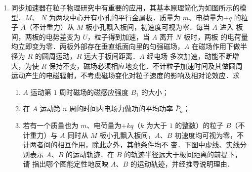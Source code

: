 \begin{enumerate}
\item 
{}
同步加速器在粒子物理研究中有重要的应用，其基本原理简化为如图所示的模型．$ M $、
$ N $ 为两块中心开有小孔的平行金属板．质量为 $ m $、电荷量为$ +q $ 的粒子
$ A $（不计重力）从 $ M $ 板小孔飘入板间，初速度可视为零．每当 $ A $ 进入
板间，两板的电势差变为 $ U $，粒子得到加速，当 $ A $ 离开 $ N $ 板时，两板
的电荷量均立即变为零．两板外部存在垂直纸面向里的匀强磁场，$ A $
在磁场作用下做半径为 $ R $ 的圆周运动，$ R $ 远大于板间距离．$ A $ 经电场
多次加速，动能不断增大，为使 $ R $ 保持不变，磁场必须相应地变化．不计粒子加速时间及其做圆周
运动产生的电磁辐射，不考虑磁场变化对粒子速度的影响及相对论效应．求
\begin{enumerate}
	\item
$ A $ 运动第 $ 1 $ 周时磁场的磁感应强度 $ B_{1} $ 的大小；

\item 
在 $ A $ 运动第 $ n $ 周的时间内电场力做功的平均功率 $ \bar{P}_{n} $；

\item 
若有一个质量也为 $ m $、电荷量为$ +kq $（$ k $ 为大于 $ 1 $ 的整数）的粒子 $ B $（不计重力）与 $ A $ 同时从
$ M $ 板小孔飘入板间，$ A $、$ B $ 初速度均可视为零，不计两者间的相互作用，除此之外，其他条件均不
变．下图中虚线、实线分别表示 $ A $、$ B $ 的运动轨迹．在 $ B $ 的轨迹半径远大于板间距离的前提下，请
指出哪个图能定性地反映 $ A $、$ B $ 的运动轨迹，并经推导说明理由．

	
\end{enumerate}
\pfourchoices
{}
{}
{}
{}
\begin{figure}[h!]
	\flushright
	
\end{figure}







\end{enumerate}
